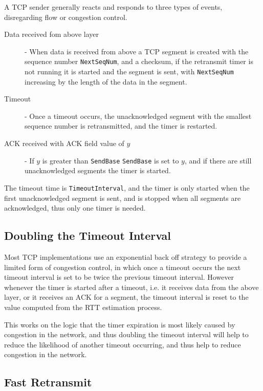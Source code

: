 \documentclass[12pt letter]{report}
\begin{document}
A TCP sender generally reacts and responds to three types of events,
disregarding flow or congestion control.
\begin{description}
  \item[Data received fom above layer] - When data is received from
    above a TCP segment is created with the sequence number
    \lstinline{NextSeqNum}, and a checksum, if the retransmit timer
    is not running it is started and the segment is sent, with
    \lstinline{NextSeqNum} increasing by the length of the data in the segment.
  \item[Timeout] - Once a timeout occurs, the unacknowledged segment
    with the smallest sequence number is retransmitted, and the timer
    is restarted.
  \item[ACK received with ACK field value of $y$] - If $y$ is greater
    than \lstinline{SendBase}
    \lstinline{SendBase} is set to $y$, and if there are still
    unacknowledged segments the timer is started.
\end{description}

The timeout time is \lstinline{TimeoutInterval}, and the timer is
only started when the first unacknowledged segment is sent, and is
stopped when all segments are acknowledged, thus only one timer is needed.

\subsection{Doubling the Timeout Interval}

Most TCP implementations use an exponential back off strategy to
provide a limited form of congestion control, in which once a timeout
occurs the next timeout interval is set to be twice the previous
timeout interval. However whenever the timer is started after a
timeout, i.e. it receives data from the above layer, or it receives
an ACK for a segment, the timeout interval is reset to the value
computed from the RTT estimation process.

This works on the logic that the timer expiration is most likely
caused by congestion in the network, and thus doubling the timeout
interval will help to reduce the likelihood of another timeout
occurring, and thus help to reduce congestion in the network.

\subsection{Fast Retransmit}

\end{document}
